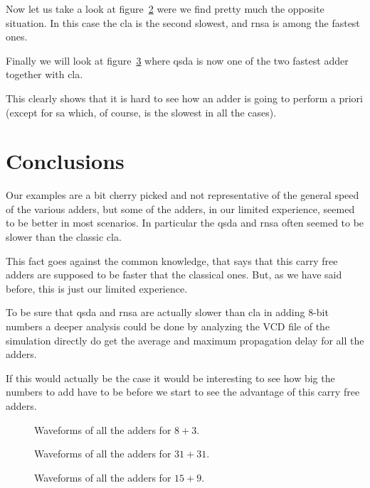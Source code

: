 \documentclass{article}
\begin{document}
Now let us take a look at figure~\ref{fig:wf_31p31} were we find pretty much the
opposite situation. In this case the cla is the second slowest, and rnsa is
among the fastest ones.

Finally we will look at figure~\ref{fig:wf_15p9} where qsda is now one of the
two fastest adder together with cla.

This clearly shows that it is hard to see how an adder is going to perform a
priori (except for sa which, of course, is the slowest in all the cases).

\section{Conclusions}

Our examples are a bit cherry picked and not representative of the general
speed of the various adders, but some of the adders, in our limited experience,
seemed to be better in most scenarios. In particular the qsda and rnsa often
seemed to be slower than the classic cla.

This fact goes against the common knowledge, that says that this carry free
adders are supposed to be faster that the classical ones. But, as we have said
before, this is just our limited experience.

To be sure that qsda and rnsa are actually slower than cla in adding 8-bit
numbers a deeper analysis could be done by analyzing the VCD file of the
simulation directly do get the average and maximum propagation delay for all the
adders.

If this would actually be the case it would be interesting to see how big the
numbers to add have to be before we start to see the advantage of this carry
free adders.

\newpage




\newpage{}

\begin{figure}
\centering
\begin{tikzpicture}[scale=0.5, rotate=90, transform shape]

\end{tikzpicture}
\caption{Waveforms of all the adders for $8+3$.}
\label{fig:wf_8p3}
\end{figure}

\begin{figure}
\centering
\begin{tikzpicture}[scale=0.5, rotate=90, transform shape]

\end{tikzpicture}
\caption{Waveforms of all the adders for $31+31$.}
\label{fig:wf_31p31}
\end{figure}

\begin{figure}
\centering
\begin{tikzpicture}[scale=0.5, rotate=90, transform shape]

\end{tikzpicture}
\caption{Waveforms of all the adders for $15+9$.}
\label{fig:wf_15p9}
\end{figure}
\end{document}
